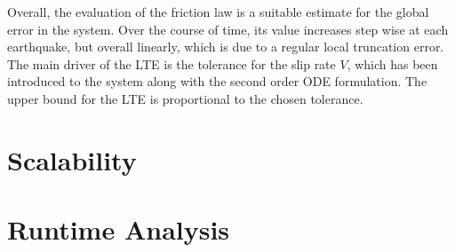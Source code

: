 Overall, the evaluation of the friction law is a suitable estimate for the global error in the system. Over the course of time, its value increases step wise at each earthquake, but overall linearly, which is due to a regular local truncation error. The main driver of the LTE is the tolerance for the slip rate $V$, which has been introduced to the system along with the second order ODE formulation. The upper bound for the LTE is proportional to the chosen tolerance.

\section{Scalability}

\section{Runtime Analysis}
